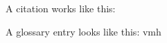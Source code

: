 \lipsum[1-2] 

A citation works like this: \cite{scheidwasser2021} 

A glossary entry looks like this: \gls{vmh}